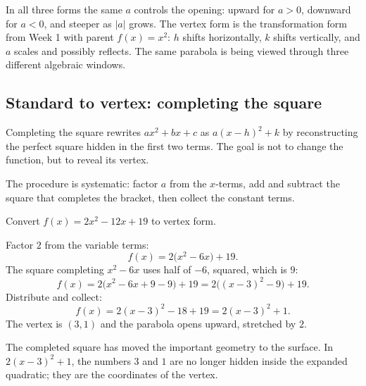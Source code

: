 \documentclass[12pt]{book}
\begin{document}
In all three forms the same $a$ controls the opening: upward for $a>0$, downward for
$a<0$, and steeper as $|a|$ grows. The vertex form is the transformation form from
Week 1 with parent $f(x)=x^2$: $h$ shifts horizontally, $k$ shifts vertically, and
$a$ scales and possibly reflects. The same parabola is being viewed through three
different algebraic windows.
\begin{center}
\end{center}

\subsection{Standard to vertex: completing the square}

Completing the square rewrites $ax^2+bx+c$ as $a(x-h)^2+k$ by reconstructing the
perfect square hidden in the first two terms. The goal is not to change the function,
but to reveal its vertex.

The procedure is systematic: factor $a$ from the $x$-terms, add and subtract the
square that completes the bracket, then collect the constant terms.
\begin{example}
Convert $f(x)=2x^2-12x+19$ to vertex form.

Factor $2$ from the variable terms:
\[
f(x)=2\big(x^2-6x\big)+19.
\]
The square completing $x^2-6x$ uses half of $-6$, squared, which is $9$:
\[
f(x)=2\big(x^2-6x+9-9\big)+19=2\big((x-3)^2-9\big)+19.
\]
Distribute and collect:
\[
f(x)=2(x-3)^2-18+19=2(x-3)^2+1.
\]
The vertex is $(3,1)$ and the parabola opens upward, stretched by $2$.
\end{example}

The completed square has moved the important geometry to the surface. In
$2(x-3)^2+1$, the numbers $3$ and $1$ are no longer hidden inside the expanded
quadratic; they are the coordinates of the vertex.
\end{document}
